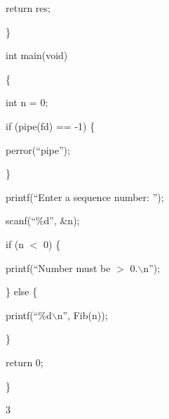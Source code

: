 \documentclass[a4paper,portrait,12pt]{article}
\begin{document}
\begin{flushleft}
return res;
\end{flushleft}


\}


\begin{flushleft}
int main(void)
\end{flushleft}


\{


\begin{flushleft}
int n = 0;
\end{flushleft}


\begin{flushleft}
if (pipe(fd) == -1) \{
\end{flushleft}


\begin{flushleft}
perror({``}pipe'');
\end{flushleft}


\}


\begin{flushleft}
printf({``}Enter a sequence number: '');
\end{flushleft}


\begin{flushleft}
scanf({``}\%d'', \&n);
\end{flushleft}


\begin{flushleft}
if (n $<$ 0) \{
\end{flushleft}


\begin{flushleft}
printf({``}Number must be $>$ 0.\ensuremath{\backslash}n'');
\end{flushleft}


\begin{flushleft}
\} else \{
\end{flushleft}


\begin{flushleft}
printf({``}\%d\ensuremath{\backslash}n'', Fib(n));
\end{flushleft}


\}


\begin{flushleft}
return 0;
\end{flushleft}


\}





3
\end{document}
